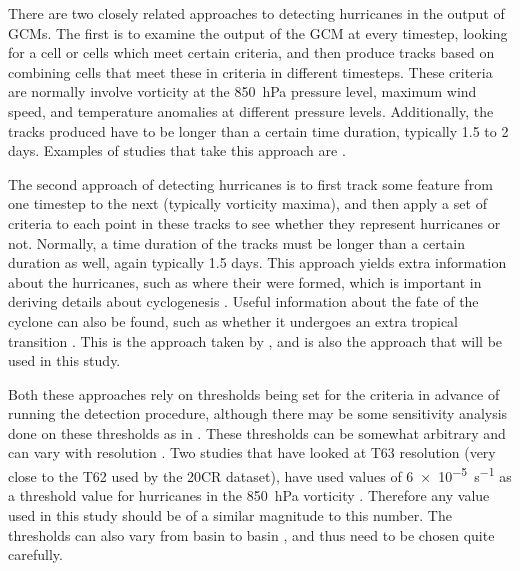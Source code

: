 \documentclass[pdftex,12pt,a4paper]{report}
\begin{document}
There are two closely related approaches to detecting hurricanes in the output of GCMs. The first is
to examine the output of the GCM at every timestep, looking for a cell or cells which meet certain
criteria, and then produce tracks based on combining cells that meet these in criteria in different
timesteps. These criteria are normally involve vorticity at the \SI{850}{hPa} pressure level,
maximum wind speed, and temperature anomalies at different pressure levels. Additionally, the tracks
produced have to be longer than a certain time duration, typically 1.5 to 2 days. Examples of
studies that take this approach are \textcite{TODOCITEmultiple}. 

The second approach of detecting hurricanes is to first track some feature from one timestep to the
next (typically vorticity maxima), and then apply a set of criteria to each point in these tracks to
see whether they represent hurricanes or not. Normally, a time duration of the tracks must be longer
than a certain duration as well, again typically 1.5 days. This approach yields extra information
about the hurricanes, such as where their were formed, which is important in deriving details about
cyclogenesis \parencite{TODOCITE}. Useful information about the fate of the cyclone can also be
found, such as whether it undergoes an extra tropical transition \parencite{TODOCITE}. This is the
approach taken by \textcite{TODOCITE, hodges, camargo}, and is also the approach that will be used
in this study.

Both these approaches rely on thresholds being set for the criteria in advance of running the
detection procedure, although there may be some sensitivity analysis done on these thresholds as in
\textcite{walsh1995}. These thresholds can be somewhat arbitrary and can vary with resolution
\parencite{walsh2007}. Two studies that have looked at T63 resolution (very close to the T62 used by
the 20CR dataset), have used values of \SI{6e-5}{s^{-1}} as a threshold value for hurricanes in the
\SI{850}{hPa} vorticity \parencite{bengtsson2006, bengtsson2007}.  Therefore any value used in this
study should be of a similar magnitude to this number.  The thresholds can also vary from basin to
basin \parencite{camargo}, and thus need to be chosen quite carefully. 
\end{document}
